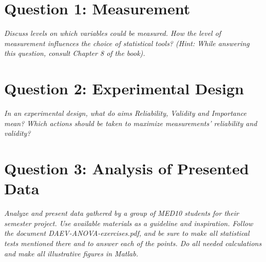 \section{Question 1: Measurement}
\textit{Discuss levels on which variables could be measured. How the level of measurement influences the choice of statistical tools? (Hint: While answering this question, consult Chapter 8 of the book).}


\section{Question 2: Experimental Design}
\textit{In an experimental design, what do aims Reliability, Validity and Importance mean? Which actions should be taken to maximize measurements' reliability and validity?}


\section{Question 3: Analysis of Presented Data}
\textit{Analyze and present data gathered by a group of MED10 students for their semester project. Use available materials as a guideline and inspiration. Follow the document DAEV-ANOVA-exercises.pdf, and be sure to make all statistical tests mentioned there and to answer each of the points. Do all needed calculations and make all illustrative figures in Matlab.}


